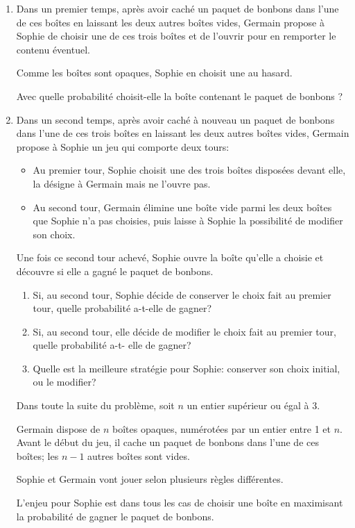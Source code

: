 \documentclass[landscape,twocolumn,leqno,a4paper,10pt]{report} %
\begin{document}
\begin{enumerate}
\item Dans un premier temps, après avoir caché un paquet de bonbons dans l'une de ces boîtes en laissant les deux autres boîtes vides, Germain propose à Sophie de choisir une de ces trois boîtes et de l'ouvrir pour en remporter le contenu éventuel.

Comme les boîtes sont opaques, Sophie en choisit une au hasard.

Avec quelle probabilité choisit-elle la boîte contenant le paquet de bonbons ?
\item Dans un second temps, après avoir caché à nouveau un paquet de bonbons dans l'une de ces trois boîtes en laissant les deux autres boîtes vides, Germain propose à Sophie un jeu qui comporte deux tours:

\begin{itemize}
\item Au premier tour, Sophie choisit une des trois boîtes disposées devant elle, la désigne à Germain mais ne l'ouvre pas.
\item Au second tour, Germain élimine une boîte vide parmi les deux boîtes que Sophie n'a pas choisies, puis laisse à Sophie la possibilité de modifier son choix.
\end{itemize}

Une fois ce second tour achevé, Sophie ouvre la boîte qu'elle a choisie et découvre si elle a gagné le paquet de bonbons.

	\begin{enumerate}
		\item Si, au second tour, Sophie décide de conserver le choix fait au premier tour, quelle probabilité a-t-elle de gagner?
		\item Si, au second tour, elle décide de modifier le choix fait au premier tour, quelle probabilité a-t- elle de gagner?
		\item Quelle est la meilleure stratégie pour Sophie: conserver son choix initial, ou le modifier?
	\end{enumerate}
	
Dans toute la suite du problème, soit $n$ un entier supérieur ou égal à 3.

Germain dispose de $n$ boîtes opaques, numérotées par un entier entre 1 et $n$. Avant le début du jeu, il cache un paquet de bonbons dans l'une de ces boîtes; les $n - 1$ autres boîtes sont vides.

Sophie et Germain vont jouer selon plusieurs règles différentes.

L'enjeu pour Sophie est dans tous les cas de choisir une boîte en maximisant la probabilité de
gagner le paquet de bonbons.
\end{enumerate}
\end{document}
